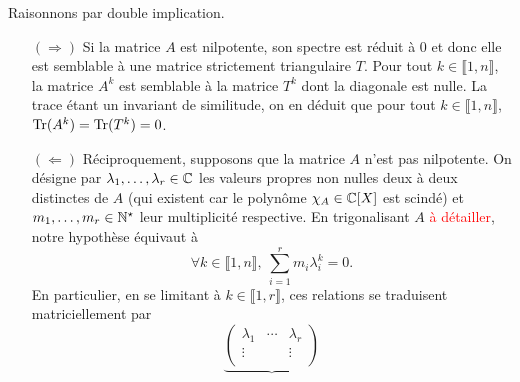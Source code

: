 \begin{preuve}
    Raisonnons par double implication.
    \begin{itemize}
        \item[$(\Rightarrow)$] Si la matrice $A$ est nilpotente, son spectre est réduit à $0$ et donc elle est semblable à une matrice strictement triangulaire $T$. Pour tout $k \in \llbracket 1, n \rrbracket$, la matrice $A^k$ est semblable à la matrice $T^k$ dont la diagonale est nulle. La trace étant un invariant de similitude, on en déduit que pour tout $k \in \llbracket 1, n \rrbracket$, $\Tr(A^k) = \Tr(T^k) = 0$.
        \item[$(\Leftarrow)$] Réciproquement, supposons que la matrice $A$ n'est pas nilpotente. On désigne par $\lambda_1, \dots, \lambda_r \in \C$ les valeurs propres non nulles deux à deux distinctes de $A$ (qui existent car le polynôme $\chi_A \in \C[X]$ est scindé) et $m_1, \dots, m_r \in \Ne$ leur multiplicité respective. En trigonalisant $A$ \textcolor{red}{à détailler}, notre hypothèse équivaut à 
        $$\forall k \in \llbracket 1, n \rrbracket,\ \sum_{i=1}^r m_i \lambda_i^k = 0.$$
        En particulier, en se limitant à $k \in \llbracket 1, r \rrbracket$, ces relations se traduisent matriciellement par
        $$
        \underbrace{
        \begin{pmatrix}
        \lambda_1 & \cdots & \lambda_r \\
        \vdots & & \vdots \\

\end{pmatrix}}$$
\end{itemize}
\end{preuve}
